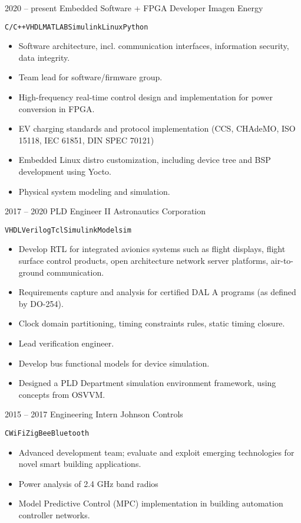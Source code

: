 \documentclass[8pt]{developercv} %
\begin{document}
\begin{entrylist}
	\entry
		{2020 -- present}
		{Embedded Software + FPGA Developer}
		{Imagen Energy}
		{        \texttt{C/C++}\slashsep\texttt{VHDL}\slashsep\texttt{MATLAB}\slashsep\texttt{Simulink}\slashsep\texttt{Linux}\slashsep\texttt{Python}
        \begin{itemize}
            \item Software architecture, incl. communication interfaces, information security, data integrity.
            \item Team lead for software/firmware group.
            \item High-frequency real-time control design and implementation for power conversion in FPGA.
            \item EV charging standards and protocol implementation (CCS, CHAdeMO, ISO 15118, IEC 61851, DIN SPEC 70121)
            \item Embedded Linux distro customization, including device tree and BSP development using Yocto.
            \item Physical system modeling and simulation.
        \end{itemize}      
        }
	\entry
		{2017 -- 2020}
		{PLD Engineer II}
		{Astronautics Corporation}
		{        \texttt{VHDL}\slashsep\texttt{Verilog}\slashsep\texttt{Tcl}\slashsep\texttt{Simulink}\slashsep\texttt{Modelsim}
        \begin{itemize}
            \item Develop RTL for integrated avionics systems such as flight displays, flight surface control products, open architecture network server platforms, air-to-ground communication.
            \item Requirements capture and analysis for certified DAL A programs (as defined by DO-254).
            \item Clock domain partitioning, timing constraints rules, static timing closure.
            \item Lead verification engineer.
            \item Develop bus functional models for device simulation.
            \item Designed a PLD Department simulation environment framework, using concepts from OSVVM.
        \end{itemize}      
        }
	\entry
		{2015 -- 2017}
        {Engineering Intern}
		{Johnson Controls}
		{        \texttt{C}\slashsep\texttt{WiFi}\slashsep\texttt{ZigBee}\slashsep\texttt{Bluetooth}
        \begin{itemize}
            \item Advanced development team; evaluate and exploit emerging technologies for novel smart building applications.
            \item Power analysis of 2.4 GHz band radios
            \item Model Predictive Control (MPC) implementation in building automation controller networks.
        \end{itemize}      
        }
\end{entrylist}
\end{document}

